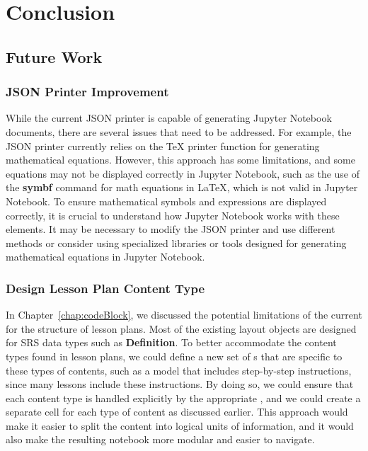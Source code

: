 \chapter{Conclusion} \label{chap:conclusion}
\section{Future Work}
\subsection{JSON Printer Improvement}
While the current JSON printer is capable of generating Jupyter Notebook 
documents, there are several issues that need to be addressed. For example, the 
JSON printer currently relies on the TeX printer function for generating 
mathematical equations. However, this approach has some limitations, and some 
equations may not be displayed correctly in Jupyter Notebook, such as the use 
of the \textbf{symbf} command for math equations in LaTeX, which is not 
valid in Jupyter Notebook. To ensure mathematical symbols and expressions are 
displayed correctly, it is crucial to understand how Jupyter Notebook works 
with these elements. It may be necessary to modify the JSON printer and use 
different methods or consider using specialized libraries or tools designed for 
generating mathematical equations in Jupyter Notebook. 

\subsection{Design Lesson Plan Content Type} \label{chap:designContentType}
In Chapter~\ref{chap:codeBlock}, we discussed the potential limitations of the 
current  for the structure of lesson plans. Most of the 
existing layout objects are designed for SRS data types such as 
\textbf{Definition}. To better accommodate the content types found in lesson 
plans, we could define a new set of s that are specific to 
these types of contents, such as a model that includes step-by-step 
instructions, since many lessons include these instructions. By doing so, we 
could ensure that each content type is handled explicitly by the appropriate 
, and we could create a separate cell for each type of 
content as discussed earlier. This approach would make it easier to split the 
content into logical units of information, and it would also make the resulting 
notebook more modular and easier to navigate.

